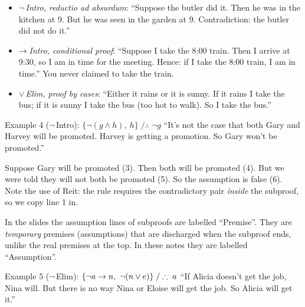 \begin{nbintuition}
\begin{itemize}[nosep]
  \item \emph{$\neg$\,Intro, reductio ad absurdum}: ``Suppose the butler did it. Then he was
        in the kitchen at 9. But he was seen in the garden at 9. Contradiction: the butler
        did not do it.''
  \item \emph{$\rightarrow$\,Intro, conditional proof}: ``Suppose I take the 8:00 train. Then I
        arrive at 9:30, so I am in time for the meeting. Hence: if I take the 8:00 train,
        I am in time.'' You never claimed to take the train.
  \item \emph{$\lor$\,Elim, proof by cases}: ``Either it rains or it is sunny. If it rains I
        take the bus; if it is sunny I take the bus (too hot to walk). So I take the bus.''
\end{itemize}
\end{nbintuition}

\begin{nbexample}{Example 4 ($\neg$\,Intro): $\{\neg(g \land h),\ h\} \;/\therefore\; \neg g$}
``It's not the case that both Gary and Harvey will be promoted. Harvey is getting a
promotion. So Gary won't be promoted.''
\begin{fitchproof}
 \RPrem
{} \RPrem
\open
{} \RAss
{} 
 
\close
{} 
\end{fitchproof}
Suppose Gary will be promoted (3). Then both will be promoted (4). But we were told they
will not both be promoted (5). So the assumption is false (6). Note the use of Reit: the
rule requires the contradictory pair \emph{inside} the subproof, so we copy line 1 in.
\end{nbexample}

\begin{nbwarning}
In the slides the assumption lines of subproofs are labelled ``Premise''. They are
\emph{temporary} premises (assumptions) that are discharged when the subproof ends, unlike
the real premises at the top. In these notes they are labelled ``Assumption''.
\end{nbwarning}

\begin{nbexample}{Example 5 ($\neg$\,Elim): $\{\neg a \rightarrow n,\ \neg(n \lor e)\} \;/\therefore\; a$}
``If Alicia doesn't get the job, Nina will. But there is no way Nina or Eloise will get the
job. So Alicia will get it.''
\begin{fitchproof}
 \RPrem
{} \RPrem
\open
{} \RAss
{} 
 
 
\close
{} 
\end{fitchproof}
\end{nbexample}

